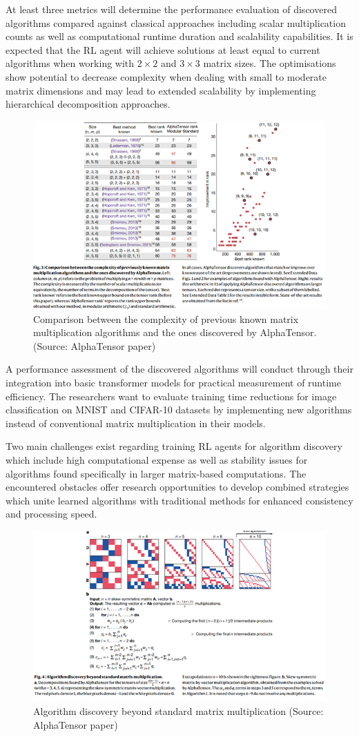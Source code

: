 \documentclass{article}
\begin{document}
At least three metrics will determine the performance evaluation of discovered algorithms compared against classical approaches including scalar multiplication counts as well as computational runtime duration and scalability capabilities. It is expected that the RL agent will achieve solutions at least equal to current algorithms when working with \( 2 \times 2 \) and \( 3 \times 3 \) matrix sizes. The optimisations show potential to decrease complexity when dealing with small to moderate matrix dimensions and may lead to extended scalability by implementing hierarchical decomposition approaches.

\begin{figure}[H]
    \centering
    \includegraphics[width=0.6\linewidth]{Picture4.png}
    \caption{Comparison between the complexity of previous known matrix multiplication algorithms and the ones discovered by AlphaTensor. (Source: AlphaTensor paper)}
    \label{fig:comparison-alphatensor}
\end{figure}

A performance assessment of the discovered algorithms will conduct through their integration into basic transformer models for practical measurement of runtime efficiency. The researchers want to evaluate training time reductions for image classification on MNIST and CIFAR-10 datasets by implementing new algorithms instead of conventional matrix multiplication in their models.

Two main challenges exist regarding training RL agents for algorithm discovery which include high computational expense as well as stability issues for algorithms found specifically in larger matrix-based computations. The encountered obstacles offer research opportunities to develop combined strategies which unite learned algorithms with traditional methods for enhanced consistency and processing speed.

\begin{figure}[H]
    \centering
    \includegraphics[width=0.6\linewidth]{Picture5.png}
    \caption{Algorithm discovery beyond standard matrix multiplication (Source: AlphaTensor paper)}
    \label{fig:standard-matrix}
\end{figure}
\end{document}
